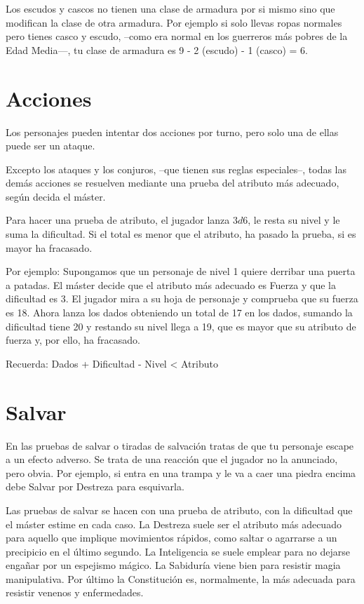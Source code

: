 \begin{multicols}{2}
\begin{table*}[p]
\begin{threeparttable}
\begin{tablenotes}
\item Los escudos y cascos no tienen una clase de armadura por si mismo sino que
modifican la clase de otra armadura. Por ejemplo si solo llevas ropas normales
pero tienes casco y escudo, --como era normal en los guerreros más pobres de la
Edad Media---, tu clase de armadura es 9 - 2 (escudo) - 1 (casco) = 6.

\end{tablenotes}
\end{threeparttable}
\end{table*}


\section{Acciones}

Los personajes pueden intentar dos acciones por turno, pero solo una de ellas
puede ser un ataque.

Excepto los ataques y los conjuros, --que tienen sus reglas especiales--, todas
las demás acciones se resuelven mediante una prueba del atributo más adecuado,
según decida el máster.

Para hacer una prueba de atributo, el jugador lanza $ 3d6$, le resta su nivel y le
suma la dificultad. Si el total es menor que el atributo, ha pasado la
prueba, si es mayor ha fracasado.

Por ejemplo: Supongamos que un personaje de nivel 1 quiere derribar una puerta a
patadas. El máster decide que el atributo más adecuado es Fuerza y que la
dificultad es 3. El jugador mira a su hoja de personaje y comprueba que su fuerza
es 18. Ahora lanza los dados obteniendo un total de 17 en los dados, sumando la
dificultad tiene 20 y restando su nivel llega a 19, que es mayor que su atributo
de fuerza y, por ello, ha fracasado.

Recuerda: Dados + Dificultad - Nivel < Atributo


\section{Salvar}

En las pruebas de salvar o tiradas de salvación tratas de que tu personaje
escape a un efecto adverso. Se trata de una reacción que el jugador no la anunciado,
pero obvia. Por ejemplo, si entra en una trampa y le va a caer una piedra encima
debe Salvar por Destreza para esquivarla.

Las pruebas de salvar se hacen con una prueba de atributo, con la dificultad que
el máster estime en cada caso. La Destreza suele ser el atributo más adecuado para
aquello que implique movimientos rápidos, como saltar o agarrarse a un precipicio
en el último segundo. La Inteligencia se suele emplear para no dejarse engañar por
un espejismo mágico. La Sabiduría viene bien para resistir magia manipulativa. Por
último la Constitución es, normalmente, la más adecuada para resistir venenos y
enfermedades.


\end{multicols}
